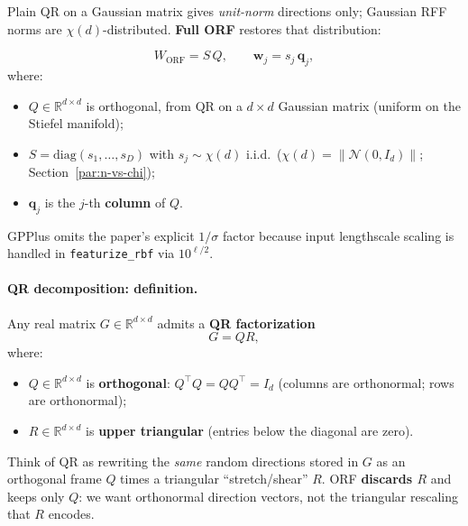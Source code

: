 \documentclass[11pt]{article}
\begin{document}
Plain QR on a Gaussian matrix gives \emph{unit-norm} directions only; Gaussian RFF norms are
$\chi(d)$-distributed. \textbf{Full ORF} restores that distribution:

\begin{equation}
  \label{eq:orf-paper}
  \boxed{
  W_{\mathrm{ORF}} = S\, Q,
  \qquad
  \mathbf w_j = s_j\,\mathbf q_j,
  }
\end{equation}
where:
\begin{itemize}
  \item $Q\in\mathbb{R}^{d\times d}$ is orthogonal, from QR on a $d\times d$ Gaussian matrix
        (uniform on the Stiefel manifold);
  \item $S=\mathrm{diag}(s_1,\ldots,s_D)$ with $s_j \sim \chi(d)$ i.i.d.\ ($\chi(d)=\|\mathcal N(0,I_d)\|$; Section~\ref{par:n-vs-chi});
  \item $\mathbf q_j$ is the $j$-th \textbf{column} of $Q$.
\end{itemize}
GPPlus omits the paper's explicit $1/\sigma$ factor because input lengthscale scaling is handled in
\texttt{featurize\_rbf} via $10^{\ell/2}$.

\paragraph{QR decomposition: definition.}
Any real matrix $G\in\mathbb{R}^{d\times d}$ admits a \textbf{QR factorization}
\begin{equation}
  \label{eq:qr-factorization}
  \boxed{
  G = Q R,
  }
\end{equation}
where:
\begin{itemize}
  \item $Q\in\mathbb{R}^{d\times d}$ is \textbf{orthogonal}: $Q^{\top}Q = Q Q^{\top} = I_d$
        (columns are orthonormal; rows are orthonormal);
  \item $R\in\mathbb{R}^{d\times d}$ is \textbf{upper triangular} (entries below the diagonal are zero).
\end{itemize}
Think of QR as rewriting the \emph{same} random directions stored in $G$ as an orthogonal frame $Q$
times a triangular ``stretch/shear'' $R$.
ORF \textbf{discards $R$} and keeps only $Q$: we want orthonormal direction vectors, not the triangular
rescaling that $R$ encodes.
\end{document}
